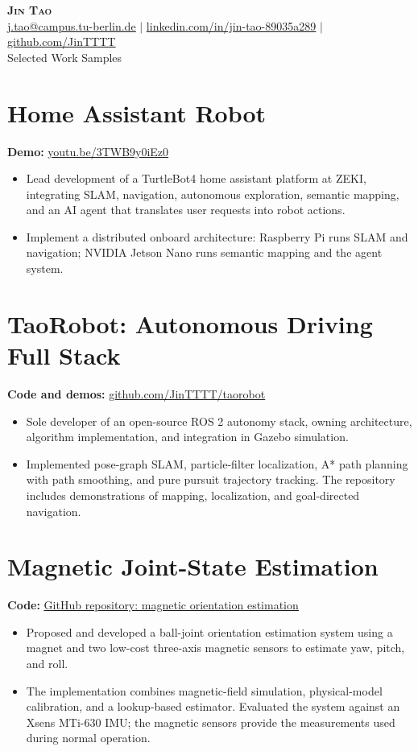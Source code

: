 \documentclass[letterpaper,11pt]{article}
\newcommand{\resumeItem}[1]{
  \item\small{
    {#1 \vspace{-2pt}}
  }
}
\newcommand{\resumeItemListStart}{\begin{itemize}[rightmargin=0.15in]\justifying}
\newcommand{\resumeItemListEnd}{\end{itemize}\vspace{-5pt}}
\begin{document}
\begin{center}
    \textbf{\Huge \scshape Jin Tao} \\ \vspace{1pt}
    \small \href{mailto:j.tao@campus.tu-berlin.de}{\underline{j.tao@campus.tu-berlin.de}} $|$
    \href{https://www.linkedin.com/in/jin-tao-89035a289/}{\underline{linkedin.com/in/jin-tao-89035a289}} $|$
    \href{https://github.com/JinTTTT}{\underline{github.com/JinTTTT}}
    \\[6pt]
    {\large Selected Work Samples}
\end{center}

\section{Home Assistant Robot}
\noindent\small\textbf{Demo:} \href{https://youtu.be/3TWB9y0iEz0}{\underline{youtu.be/3TWB9y0iEz0}}
\resumeItemListStart
    \resumeItem{Lead development of a TurtleBot4 home assistant platform at ZEKI, integrating SLAM, navigation, autonomous exploration, semantic mapping, and an AI agent that translates user requests into robot actions.}
    \resumeItem{Implement a distributed onboard architecture: Raspberry Pi runs SLAM and navigation; NVIDIA Jetson Nano runs semantic mapping and the agent system.}
\resumeItemListEnd

\section{TaoRobot: Autonomous Driving Full Stack}
\noindent\small\textbf{Code and demos:} \href{https://github.com/JinTTTT/taorobot}{\underline{github.com/JinTTTT/taorobot}}
\resumeItemListStart
    \resumeItem{Sole developer of an open-source ROS 2 autonomy stack, owning architecture, algorithm implementation, and integration in Gazebo simulation.}
    \resumeItem{Implemented pose-graph SLAM, particle-filter localization, A* path planning with path smoothing, and pure pursuit trajectory tracking. The repository includes demonstrations of mapping, localization, and goal-directed navigation.}
\resumeItemListEnd

\section{Magnetic Joint-State Estimation}
\noindent\small\textbf{Code:} \href{https://github.com/JinTTTT/magnetic_field_simulation_for_rollPitchYaw_estimation}{\underline{GitHub repository: magnetic orientation estimation}}
\resumeItemListStart
    \resumeItem{Proposed and developed a ball-joint orientation estimation system using a magnet and two low-cost three-axis magnetic sensors to estimate yaw, pitch, and roll.}
    \resumeItem{The implementation combines magnetic-field simulation, physical-model calibration, and a lookup-based estimator. Evaluated the system against an Xsens MTi-630 IMU; the magnetic sensors provide the measurements used during normal operation.}
\resumeItemListEnd
\end{document}
